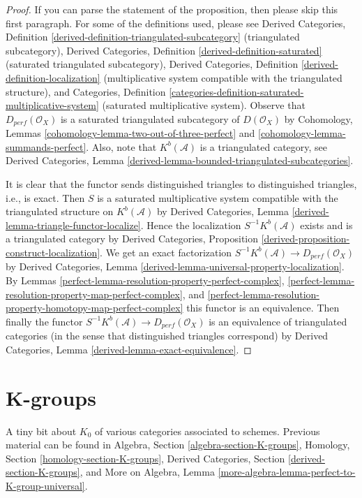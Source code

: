 \begin{proof}

If you can parse the statement of the proposition, then please skip this
first paragraph. For some of the definitions used, please see
Derived Categories, Definition
\ref{derived-definition-triangulated-subcategory}
(triangulated subcategory),
Derived Categories, Definition \ref{derived-definition-saturated}
(saturated triangulated subcategory),
Derived Categories, Definition \ref{derived-definition-localization}
(multiplicative system compatible with the triangulated structure), and
Categories,
Definition \ref{categories-definition-saturated-multiplicative-system}
(saturated multiplicative system).
Observe that $D_{perf}(\mathcal{O}_X)$ is a saturated triangulated subcategory
of $D(\mathcal{O}_X)$ by
Cohomology, Lemmas \ref{cohomology-lemma-two-out-of-three-perfect} and
\ref{cohomology-lemma-summands-perfect}. Also, note that
$K^b(\mathcal{A})$ is a triangulated category, see
Derived Categories, Lemma
\ref{derived-lemma-bounded-triangulated-subcategories}.

\medskip\noindent
It is clear that the functor sends distinguished triangles to
distinguished triangles, i.e., is exact. Then $S$ is a saturated
multiplicative system compatible with the triangulated structure
on $K^b(\mathcal{A})$ by
Derived Categories, Lemma \ref{derived-lemma-triangle-functor-localize}.
Hence the localization $S^{-1}K^b(\mathcal{A})$ exists and is
a triangulated category by
Derived Categories, Proposition
\ref{derived-proposition-construct-localization}.
We get an exact factorization
$S^{-1}K^b(\mathcal{A}) \to D_{perf}(\mathcal{O}_X)$ by
Derived Categories, Lemma
\ref{derived-lemma-universal-property-localization}.
By Lemmas \ref{perfect-lemma-resolution-property-perfect-complex},
\ref{perfect-lemma-resolution-property-map-perfect-complex}, and
\ref{perfect-lemma-resolution-property-homotopy-map-perfect-complex}
this functor is an equivalence. Then finally the functor
$S^{-1}K^b(\mathcal{A}) \to D_{perf}(\mathcal{O}_X)$
is an equivalence of triangulated categories (in the sense that
distinguished triangles correspond) by
Derived Categories, Lemma \ref{derived-lemma-exact-equivalence}.
\end{proof}

\section{K-groups}
\label{perfect-section-K-groups}
A tiny bit about $K_0$ of various categories associated to schemes.
Previous material can be found in
Algebra, Section \ref{algebra-section-K-groups},
Homology, Section \ref{homology-section-K-groups},
Derived Categories, Section \ref{derived-section-K-groups}, and
More on Algebra, Lemma \ref{more-algebra-lemma-perfect-to-K-group-universal}.

